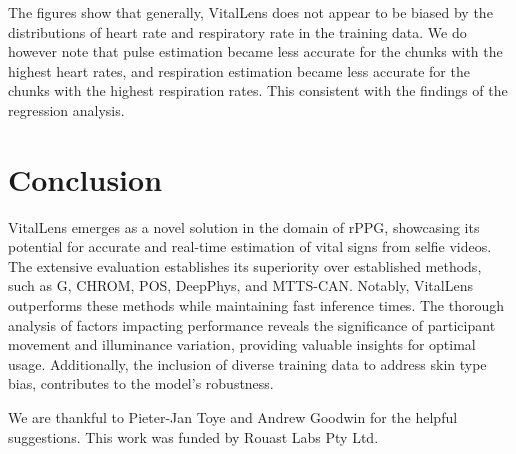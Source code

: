 \documentclass{article}
\begin{document}
The figures show that generally, VitalLens does not appear to be biased by the distributions of heart rate and respiratory rate in the training data.
We do however note that pulse estimation became less accurate for the chunks with the highest heart rates, and respiration estimation became less accurate for the chunks with the highest respiration rates.
This consistent with the findings of the regression analysis.

\section{Conclusion}
\label{sec:conclusion}

VitalLens emerges as a novel solution in the domain of rPPG, showcasing its potential for accurate and real-time estimation of vital signs from selfie videos.
The extensive evaluation establishes its superiority over established methods, such as G, CHROM, POS, DeepPhys, and MTTS-CAN.
Notably, VitalLens outperforms these methods while maintaining fast inference times.
The thorough analysis of factors impacting performance reveals the significance of participant movement and illuminance variation, providing valuable insights for optimal usage.
Additionally, the inclusion of diverse training data to address skin type bias, contributes to the model's robustness.

\begin{ack}
We are thankful to Pieter-Jan Toye and Andrew Goodwin for the helpful suggestions.
This work was funded by Rouast Labs Pty Ltd.
\end{ack}




\end{document}
